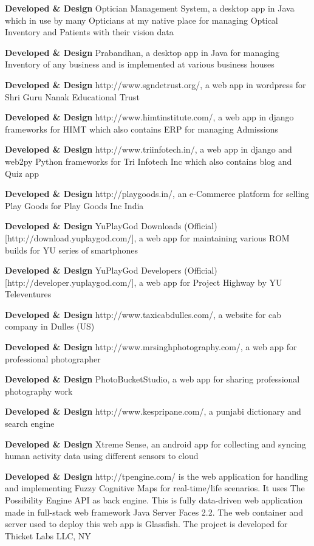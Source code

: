 \documentclass[margin,line]{res}
\begin{document}
\begin{resume}
\textbf{Developed \& Design} Optician Management System, a desktop app in Java which in use by many Opticians at my native place for managing Optical Inventory and Patients with their vision data

\textbf{Developed \& Design} Prabandhan, a desktop app in Java for managing Inventory of any business and is implemented at various business houses

\textbf{Developed \& Design} http://www.sgndetrust.org/, a web app in wordpress for Shri Guru Nanak Educational Trust

\textbf{Developed \& Design} http://www.himtinstitute.com/, a web app in django frameworks for HIMT which also contains ERP for managing Admissions

\textbf{Developed \& Design} http://www.triinfotech.in/, a web app in django and web2py Python frameworks for Tri Infotech Inc which also contains blog and Quiz app

\textbf{Developed \& Design} http://playgoods.in/, an e-Commerce platform for selling Play Goods for Play Goods Inc India

\textbf{Developed \& Design} YuPlayGod Downloads (Official) [http://download.yuplaygod.com/], a web app for maintaining various ROM builds for YU series of smartphones

\textbf{Developed \& Design} YuPlayGod Developers (Official) [http://developer.yuplaygod.com/], a web app for Project Highway by YU Televentures

\textbf{Developed \& Design} http://www.taxicabdulles.com/, a website for cab company in Dulles (US)

\textbf{Developed \& Design} http://www.mrsinghphotography.com/, a web app for professional photographer

\textbf{Developed \& Design} PhotoBucketStudio, a web app for sharing professional photography work

\textbf{Developed \& Design} http://www.kespripane.com/, a punjabi dictionary and search engine

\textbf{Developed \& Design} Xtreme Sense, an android app for collecting and syncing human activity data using different sensors to cloud

\textbf{Developed \& Design} http://tpengine.com/ is the web application for handling and implementing Fuzzy Cognitive Maps for real-time/life scenarios. It uses The Possibility Engine API as back engine. This is fully data-driven web application made in full-stack web framework Java Server Faces 2.2. The web container and server used to deploy this web app is Glassfish. The project is developed for  Thicket Labs LLC, NY


\end{resume}
\end{document}
